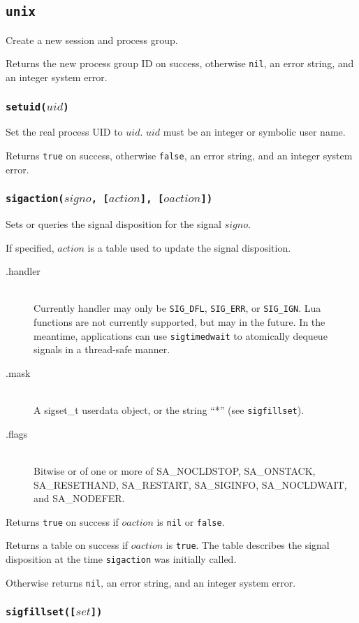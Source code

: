 \documentclass[11pt, oneside]{memoir}
\newcommand*{\true}[0]{\texttt{true}\xspace}
\newcommand*{\false}[0]{\texttt{false}\xspace}
\newcommand*{\nil}[0]{\texttt{nil}\xspace}
\newcommand*{\syscall}[1]{\texttt{#1}\xspace}
\newcommand*{\fn}[1]{\texttt{#1}\xspace}
\newcounter{toccols}
\newenvironment{Module}[1]{
	\subsection{\texttt{#1}}
	\addtocontents{toc}{
		\protect\begin{multicols}{\value{toccols}}
	}
}{
	\addtocontents{toc}{\protect\end{multicols}}
}
\begin{document}
\begin{Module}{unix}
Create a new session and process group.

Returns the new process group ID on success, otherwise \nil, an error string, and an integer system error.

\subsubsection[\fn{setuid}]{\fn{setuid($uid$)}}

Set the real process UID to $uid$. $uid$ must be an integer or symbolic user name.

Returns \true on success, otherwise \false, an error string, and an integer system error.

\subsubsection[\fn{sigaction}]{\fn{sigaction($signo$, [$action$], [$oaction$])}}

Sets or queries the signal disposition for the signal $signo$.

If specified, $action$ is a table used to update the signal disposition.

\begin{description}
\item[.handler] \hfill \\
Currently handler may only be \texttt{SIG\_DFL}, \texttt{SIG\_ERR}, or \texttt{SIG\_IGN}.
Lua functions are not currently supported, but may in the future. In the meantime, applications can use \fn{sigtimedwait} to atomically dequeue signals in a thread-safe manner.
\item[.mask] \hfill \\
A sigset\_t userdata object, or the string ``*'' (see \fn{sigfillset}).
\item[.flags] \hfill \\
Bitwise or of one or more of SA\_NOCLDSTOP, SA\_ONSTACK, SA\_RESETHAND, SA\_RESTART, SA\_SIGINFO, SA\_NOCLDWAIT, and SA\_NODEFER.
\end{description}

Returns \true on success if $oaction$ is \nil or \false.

Returns a table on success if $oaction$ is \true. The table describes the signal disposition at the time \syscall{sigaction} was initially called.

Otherwise returns \nil, an error string, and an integer system error.

\subsubsection[\fn{sigfillset}]{\fn{sigfillset([$set$])}}


\end{Module}
\end{document}

